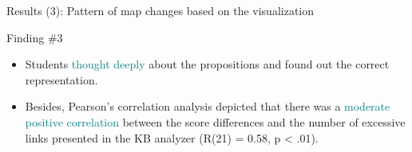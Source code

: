 \begin{frame}{Results (3): Pattern of map changes based on the visualization}
\begin{block}{Finding \#3}
\begin{itemize}
    \item <+->Students \textcolor{teal}{thought deeply} about the propositions and found out the correct representation. 
    \item <+-> Besides, Pearson’s correlation analysis depicted that there was a \textcolor{teal}{moderate positive correlation} between the score differences and the number of excessive links presented in the KB analyzer (R(21) = 0.58, p < .01).
\end{itemize}
\end{block}

\end{frame}
